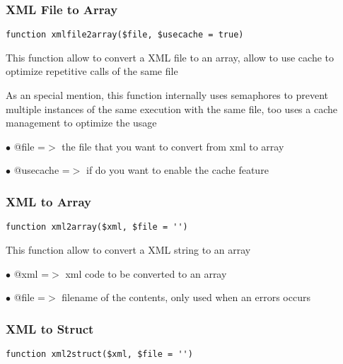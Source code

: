 \documentclass[a4paper]{article}
\begin{document}
\hypertarget{toc278}{}
\subsubsection{XML File to Array}

\begin{lstlisting}
function xmlfile2array($file, $usecache = true)
\end{lstlisting}

This function allow to convert a XML file to an array, allow to use cache to
optimize repetitive calls of the same file

As an special mention, this function internally uses semaphores to prevent
multiple instances of the same execution with the same file, too uses a cache
management to optimize the usage

\begin{compactitem}
\item[\color{myblue}$\bullet$] @file     =$>$ the file that you want to convert from xml to array
\item[\color{myblue}$\bullet$] @usecache =$>$ if do you want to enable the cache feature
\end{compactitem}

\hypertarget{toc279}{}
\subsubsection{XML to Array}

\begin{lstlisting}
function xml2array($xml, $file = '')
\end{lstlisting}

This function allow to convert a XML string to an array

\begin{compactitem}
\item[\color{myblue}$\bullet$] @xml  =$>$ xml code to be converted to an array
\item[\color{myblue}$\bullet$] @file =$>$ filename of the contents, only used when an errors occurs
\end{compactitem}

\hypertarget{toc280}{}
\subsubsection{XML to Struct}

\begin{lstlisting}
function xml2struct($xml, $file = '')
\end{lstlisting}
\end{document}
